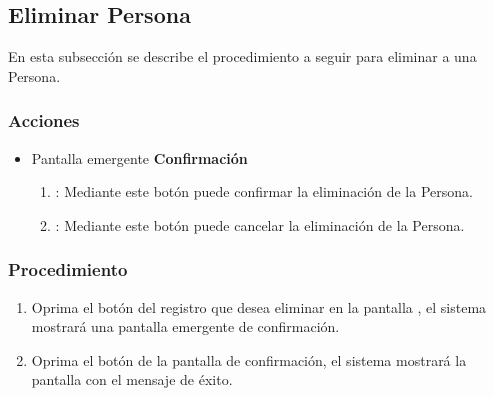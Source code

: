 \subsection{Eliminar Persona}

En esta subsección se describe el procedimiento a seguir para eliminar a una Persona.


\subsubsection{Acciones}
\begin{itemize}
  \item Pantalla emergente \textbf{Confirmación}
  \begin{enumerate}
	\item {}: Mediante este botón puede confirmar la eliminación de la Persona.
	\item {}: Mediante este botón puede cancelar la eliminación de la Persona.
  \end{enumerate}
\end{itemize}


\subsubsection{Procedimiento}
\begin{enumerate}
	\item Oprima el botón \btnEliminar del registro que desea eliminar en la pantalla , el sistema mostrará una pantalla emergente de confirmación.
	
	\item Oprima el botón  de la pantalla de confirmación, el sistema mostrará la pantalla  con el mensaje de éxito.
\end{enumerate}

